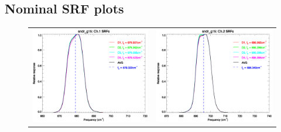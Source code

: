 \subsection{Nominal SRF plots}

\begin{figure}[htp]
  \centering
  \begin{tabular}{c c}
    \includegraphics[scale=0.5]{graphics/nominal/sndr_g15.ch1.srf.eps} &
    \includegraphics[scale=0.5]{graphics/nominal/sndr_g15.ch2.srf.eps} \\

\end{tabular}
\end{figure}
